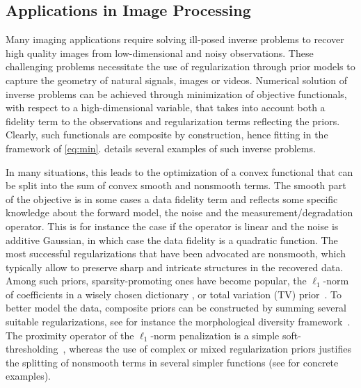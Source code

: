 \subsection{Applications in Image Processing}

Many imaging applications require solving ill-posed inverse problems to recover high quality images from low-dimensional and noisy observations. These challenging problems necessitate the use of regularization through prior models to capture the geometry of natural signals, images or videos. Numerical solution of inverse problems can be achieved through minimization of objective functionals, with respect to a high-dimensional variable, that takes into account both a fidelity term to the observations and regularization terms reflecting the priors. Clearly, such functionals are composite by construction, hence fitting in the framework of \eqref{eq:min}.  details several examples of such inverse problems.  

In many situations, this leads to the optimization of a convex functional that can be split into the sum of convex smooth and nonsmooth terms. The smooth part of the objective is in some cases a data fidelity term and reflects some specific knowledge about the forward model, \ie the noise and the measurement/degradation operator. This is for instance the case if the operator is linear and the noise is additive Gaussian, in which case the data fidelity is a quadratic function. The most successful regularizations that have been advocated are nonsmooth, which typically allow to preserve sharp and intricate structures in the recovered data. Among such priors, sparsity-promoting ones have become popular, \eg the $\ell_1$-norm of coefficients in a wisely chosen dictionary \cite{Mallat99}, or total variation (TV) prior~\cite{ROF92}. To better model the data, composite priors can be constructed by summing several suitable regularizations, see for instance the morphological diversity framework~\cite{FadiliStarckBook09}. The proximity operator of the $\ell_1$-norm penalization is a simple soft-thresholding~\cite{Donoho95}, whereas the use of complex or mixed regularization priors justifies the splitting of nonsmooth terms in several simpler functions (see  for concrete examples).

